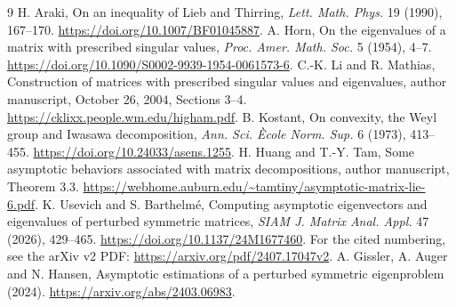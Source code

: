 \documentclass[11pt]{article}
\begin{document}
\begin{thebibliography}{9}
 H. Araki, On an inequality of Lieb and Thirring,
\emph{Lett. Math. Phys.} 19 (1990), 167--170.
\url{https://doi.org/10.1007/BF01045887}.
 A. Horn, On the eigenvalues of a matrix with prescribed
singular values, \emph{Proc. Amer. Math. Soc.} 5 (1954), 4--7.
\url{https://doi.org/10.1090/S0002-9939-1954-0061573-6}.
 C.-K. Li and R. Mathias, Construction of matrices
with prescribed singular values and eigenvalues, author manuscript,
October 26, 2004, Sections 3--4.
\url{https://cklixx.people.wm.edu/higham.pdf}.
 B. Kostant, On convexity, the Weyl group and Iwasawa
decomposition, \emph{Ann. Sci. \`Ecole Norm. Sup.} 6 (1973), 413--455.
\url{https://doi.org/10.24033/asens.1255}.
 H. Huang and T.-Y. Tam, Some asymptotic behaviors
associated with matrix decompositions, author manuscript, Theorem 3.3.
\url{https://webhome.auburn.edu/~tamtiny/asymptotic-matrix-lie-6.pdf}.
 K. Usevich and S. Barthelm\'e, Computing asymptotic
eigenvectors and eigenvalues of perturbed symmetric matrices,
\emph{SIAM J. Matrix Anal. Appl.} 47 (2026), 429--465.
\url{https://doi.org/10.1137/24M1677460}.
For the cited numbering, see the arXiv v2 PDF:
\url{https://arxiv.org/pdf/2407.17047v2}.
 A. Gissler, A. Auger and N. Hansen, Asymptotic
estimations of a perturbed symmetric eigenproblem (2024).
\url{https://arxiv.org/abs/2403.06983}.
\end{thebibliography}
\end{document}
